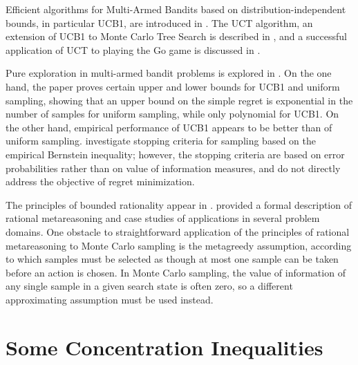 \documentclass{article}
\begin{document}
Efficient algorithms for Multi-Armed Bandits based on
distribution-independent bounds, in particular UCB1, are introduced in
\cite{Auer.ucb}. The UCT algorithm, an extension of UCB1 to Monte
Carlo Tree Search is described in \cite{Kocsis.uct}, and a successful
application of UCT to playing the Go game is discussed in
\cite{Gelly.mogo}.

Pure exploration in multi-armed bandit problems is explored in
\cite{Bubeck.pure}. On the one hand, the paper proves certain upper
and lower bounds for UCB1 and uniform sampling, showing that an upper
bound on the simple regret is exponential in the number of samples for
uniform sampling, while only polynomial for UCB1. On the other hand,
empirical performance of UCB1 appears to be better than of uniform
sampling. \cite{Mnih.bernstop} investigate stopping criteria for
sampling based on the empirical Bernstein inequality; however, the
stopping criteria are based on error probabilities rather than on
value of information measures, and do not directly address the
objective of regret minimization.

The principles of bounded rationality appear in
\cite{Horvitz.reasoningabout}. \cite{Russell.right} provided a formal
description of rational metareasoning and case studies of applications
in several problem domains. One obstacle to straightforward
application of the principles of rational metareasoning to Monte Carlo
sampling is the metagreedy assumption, according to which samples must
be selected as though at most one sample can be taken before an action
is chosen. In Monte Carlo sampling, the value of information of any
single sample in a given search state is often zero, so a different
approximating assumption must be used instead.

\section{Some Concentration Inequalities}
\end{document}
